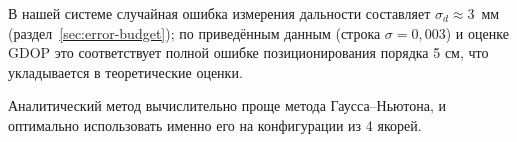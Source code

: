В нашей системе случайная ошибка измерения дальности составляет $\sigma_d \approx 3$~мм
(раздел~\ref{sec:error-budget}); по приведённым данным (строка $\sigma=0{,}003$) и оценке GDOP
это соответствует полной ошибке позиционирования порядка 5 см, что укладывается в теоретические оценки.

Аналитический метод вычислительно проще метода Гаусса--Ньютона, и оптимально использовать именно его
на конфигурации из 4 якорей.
\FloatBarrier
